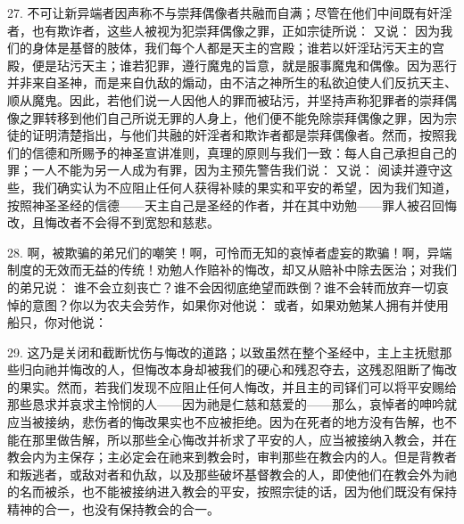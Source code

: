 27. 不可让新异端者因声称不与崇拜偶像者共融而自满；尽管在他们中间既有奸淫者，也有欺诈者，这些人被视为犯崇拜偶像之罪，正如宗徒所说： 又说： 因为我们的身体是基督的肢体，我们每个人都是天主的宫殿；谁若以奸淫玷污天主的宫殿，便是玷污天主；谁若犯罪，遵行魔鬼的旨意，就是服事魔鬼和偶像。因为恶行并非来自圣神，而是来自仇敌的煽动，由不洁之神所生的私欲迫使人们反抗天主、顺从魔鬼。因此，若他们说一人因他人的罪而被玷污，并坚持声称犯罪者的崇拜偶像之罪转移到他们自己所说无罪的人身上，他们便不能免除崇拜偶像之罪，因为宗徒的证明清楚指出，与他们共融的奸淫者和欺诈者都是崇拜偶像者。然而，按照我们的信德和所赐予的神圣宣讲准则，真理的原则与我们一致：每人自己承担自己的罪；一人不能为另一人成为有罪，因为主预先警告我们说： 又说： 阅读并遵守这些，我们确实认为不应阻止任何人获得补赎的果实和平安的希望，因为我们知道，按照神圣圣经的信德——天主自己是圣经的作者，并在其中劝勉——罪人被召回悔改，且悔改者不会得不到宽恕和慈悲。\par

28. 啊，被欺骗的弟兄们的嘲笑！啊，可怜而无知的哀悼者虚妄的欺骗！啊，异端制度的无效而无益的传统！劝勉人作赔补的悔改，却又从赔补中除去医治；对我们的弟兄说： 谁不会立刻丧亡？谁不会因彻底绝望而跌倒？谁不会转而放弃一切哀悼的意图？你以为农夫会劳作，如果你对他说： 或者，如果劝勉某人拥有并使用船只，你对他说：\par

29. 这乃是关闭和截断忧伤与悔改的道路；以致虽然在整个圣经中，主上主抚慰那些归向祂并悔改的人，但悔改本身却被我们的硬心和残忍夺去，这残忍阻断了悔改的果实。然而，若我们发现不应阻止任何人悔改，并且主的司铎们可以将平安赐给那些恳求并哀求主怜悯的人——因为祂是仁慈和慈爱的——那么，哀悼者的呻吟就应当被接纳，悲伤者的悔改果实也不应被拒绝。因为在死者的地方没有告解，也不能在那里做告解，所以那些全心悔改并祈求了平安的人，应当被接纳入教会，并在教会内为主保存；主必定会在祂来到教会时，审判那些在教会内的人。但是背教者和叛逃者，或敌对者和仇敌，以及那些破坏基督教会的人，即使他们在教会外为祂的名而被杀，也不能被接纳进入教会的平安，按照宗徒的话，因为他们既没有保持精神的合一，也没有保持教会的合一。\par

